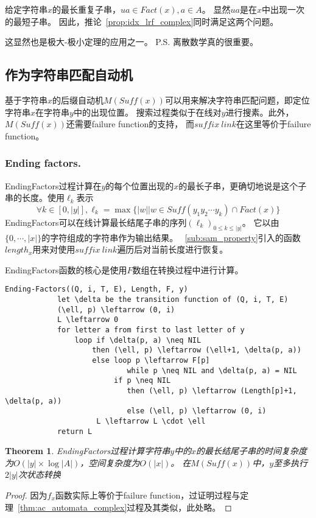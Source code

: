 \documentclass[UTF8]{ctexart}
\newtheorem{thm}{Theorem}[subsection]
\theoremstyle{definition}
\theoremstyle{remark}
\numberwithin{equation}{subsection}
\newcommand{\Suff}{\textit{Suff}}
\begin{document}
	给定字符串$x$的最长重复子串，$ua \in Fact(x), a \in A$。
	显然$ua$是在$x$中出现一次的最短子串。
	因此，推论~\ref{prop:idx_lrf_complex}同时满足这两个问题。
	
	这显然也是极大-极小定理的应用之一。
	P.S. 离散数学真的很重要。
	
\subsection{作为字符串匹配自动机}
\label{sub:as_strmatch_automata}
	
	基于字符串$x$的后缀自动机$M(\Suff(x))$可以用来解决字符串匹配问题，即定位字符串$x$在字符串$y$中的出现位置。
	搜索过程类似于在线对$y$进行搜素。此外，$M(\Suff(x))$还需要failure function的支持，
	而$suffix\ link$在这里等价于failure function。
	
\subsubsection{Ending factors.}
\label{subsub:strmacth_end_factor}

	EndingFactors过程计算在$y$的每个位置出现的$x$的最长子串，更确切地说是这个子串的长度。使用$\ell_k$表示
	\[
		\forall k \in [0, |y|], \ell_k = \max \{ |w| | w \in \Suff(y_1 y_2 \cdots y_k) \cap Fact(x) \}
	\]
	EndingFactors可以在线计算最长结尾子串的序列$(\ell_k)_{0 \le k \le |y|}$。
	它以由$\{0, \cdots, |x|\}$的字符组成的字符串作为输出结果。
	~\ref{sub:sam_property}引入的函数$length_x$用来对使用$suffix\ link$遍历后对当前长度进行恢复。
	
	EndingFactors函数的核心是使用$F$数组在转换过程中进行计算。
	\begin{lstlisting}[frame=shadowbox,framexleftmargin=5mm,rulesepcolor=\color{gray},numbers=none]
		Ending-Factors((Q, i, T, E), Length, F, y)
			let \delta be the transition function of (Q, i, T, E)
			(\ell, p) \leftarrow (0, i)
			L \leftarrow 0
			for letter a from first to last letter of y
				loop if \delta(p, a) \neq NIL
					then (\ell, p) \leftarrow (\ell+1, \delta(p, a))
					else loop p \leftarrow F[p]
							while p \neq NIL and \delta(p, a) = NIL
						 if p \neq NIL
							then (\ell, p) \leftarrow (Length[p]+1, \delta(p, a))
							else (\ell, p) \leftarrow (0, i)
					 L \leftarrow L \cdot \ell
			return L
	\end{lstlisting}
	
	\begin{thm}
		EndingFactors过程计算字符串$y$中的$x$的最长结尾子串的时间复杂度为$O(|y| \times \log |A|)$，空间复杂度为$O(|x|)$。
		在$M(\Suff(x))$中，$y$至多执行$2|y|$次状态转换
	\end{thm}
	\begin{proof}
		因为$f_x$函数实际上等价于failure function，过证明过程与定理~\ref{thm:ac_automata_complex}过程及其类似，此处略。
	\end{proof}
	
\end{document}
